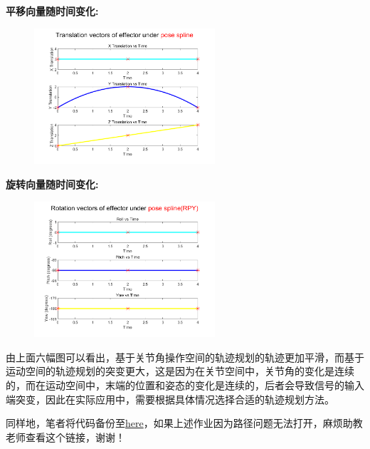 \documentclass{ctexart}
\begin{document}
\textbf{\textcolor{cherry}{平移向量随时间变化:}}
\begin{figure}[h]
	\centering
	\includegraphics[width=0.6\textwidth]{Image/effector_trans_diagram_pose.png}

\end{figure}

\textbf{\textcolor{cherry}{旋转向量随时间变化:}}
\begin{figure}[h]
	\centering
	\includegraphics[width=0.6\textwidth]{Image/effector_rotation_diagram_pose.png}
\end{figure}

由上面六幅图可以看出，基于关节角操作空间的轨迹规划的轨迹更加平滑，而基于运动空间的轨迹规划的突变更大，这是因为在关节空间中，关节角的变化是连续的，而在运动空间中，末端的位置和姿态的变化是连续的，后者会导致信号的输入端突变，因此在实际应用中，需要根据具体情况选择合适的轨迹规划方法。

同样地，笔者将代码备份至\href{https://github.com/Racheus/Robotics-Caprice/tree/master/Homework5-Kinematic-Trajectory-Planning/src}{here}，如果上述作业因为路径问题无法打开，麻烦助教老师查看这个链接，谢谢！
\end{document}
